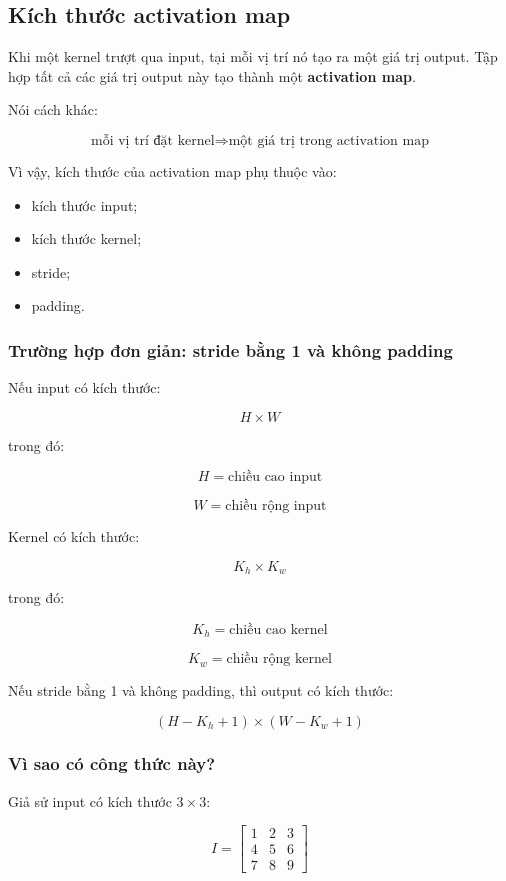 \subsection{Kích thước activation map}

Khi một kernel trượt qua input, tại mỗi vị trí nó tạo ra một giá trị output. Tập hợp tất cả các giá trị output này tạo thành một \textbf{activation map}.

Nói cách khác:

\[
    \text{mỗi vị trí đặt kernel}
    \Rightarrow
    \text{một giá trị trong activation map}
\]

Vì vậy, kích thước của activation map phụ thuộc vào:

\begin{itemize}
    \item kích thước input;
    \item kích thước kernel;
    \item stride;
    \item padding.
\end{itemize}

\subsubsection{Trường hợp đơn giản: stride bằng 1 và không padding}

Nếu input có kích thước:

\[
    H \times W
\]

trong đó:

\[
    H = \text{chiều cao input}
\]

\[
    W = \text{chiều rộng input}
\]

Kernel có kích thước:

\[
    K_h \times K_w
\]

trong đó:

\[
    K_h = \text{chiều cao kernel}
\]

\[
    K_w = \text{chiều rộng kernel}
\]

Nếu stride bằng 1 và không padding, thì output có kích thước:

\[
    (H-K_h+1) \times (W-K_w+1)
\]

\subsubsection{Vì sao có công thức này?}

Giả sử input có kích thước $3 \times 3$:

\[
I=
\begin{bmatrix}
1 & 2 & 3\\
4 & 5 & 6\\
7 & 8 & 9
\end{bmatrix}
\]

